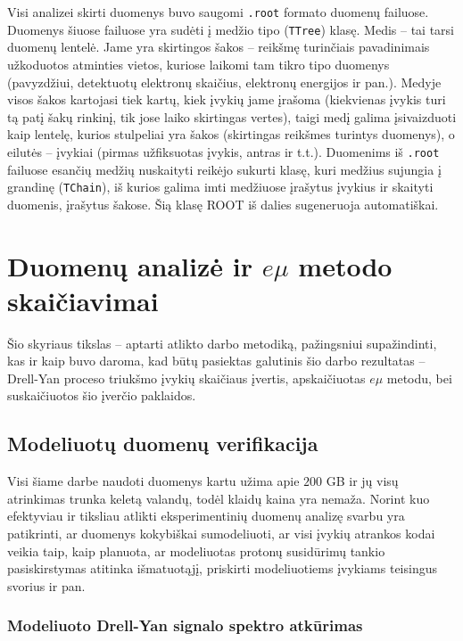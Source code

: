 \documentclass[a4paper, 12pt]{article}
\begin{document}
Visi analizei skirti duomenys buvo saugomi \texttt{.root} formato duomenų failuose. Duomenys šiuose failuose yra sudėti į medžio tipo (\texttt{TTree}) klasę. Medis -- tai tarsi duomenų lentelė. Jame yra skirtingos šakos -- reikšmę turinčiais pavadinimais užkoduotos atminties vietos, kuriose laikomi tam tikro tipo duomenys (pavyzdžiui, detektuotų elektronų skaičius, elektronų energijos ir pan.). Medyje visos šakos kartojasi tiek kartų, kiek įvykių jame įrašoma (kiekvienas įvykis turi tą patį šakų rinkinį, tik jose laiko skirtingas vertes), taigi medį galima įsivaizduoti kaip lentelę, kurios stulpeliai yra šakos (skirtingas reikšmes turintys duomenys), o eilutės -- įvykiai (pirmas užfiksuotas įvykis, antras ir t.t.). Duomenims iš \texttt{.root} failuose esančių medžių nuskaityti reikėjo sukurti klasę, kuri medžius sujungia į grandinę (\texttt{TChain}), iš kurios galima imti medžiuose įrašytus įvykius ir skaityti duomenis, įrašytus šakose. Šią klasę ROOT iš dalies sugeneruoja automatiškai.

\clearpage
\section{Duomenų analizė ir $e\mu$ metodo skaičiavimai}

Šio skyriaus tikslas -- aptarti atlikto darbo metodiką, pažingsniui supažindinti, kas ir kaip buvo daroma, kad būtų pasiektas galutinis šio darbo rezultatas -- Drell-Yan proceso triukšmo įvykių skaičiaus įvertis, apskaičiuotas $e\mu$ metodu, bei suskaičiuotos šio įverčio paklaidos.

\subsection{Modeliuotų duomenų verifikacija}

Visi šiame darbe naudoti duomenys kartu užima apie $200$ GB ir jų visų atrinkimas trunka keletą valandų, todėl klaidų kaina yra nemaža. Norint kuo efektyviau ir tiksliau atlikti eksperimentinių duomenų analizę svarbu yra patikrinti, ar duomenys kokybiškai sumodeliuoti, ar visi įvykių atrankos kodai veikia taip, kaip planuota, ar modeliuotas protonų susidūrimų tankio pasiskirstymas atitinka išmatuotąjį, priskirti modeliuotiems įvykiams teisingus svorius ir pan.

\subsubsection{Modeliuoto Drell-Yan signalo spektro atkūrimas}
\end{document}
